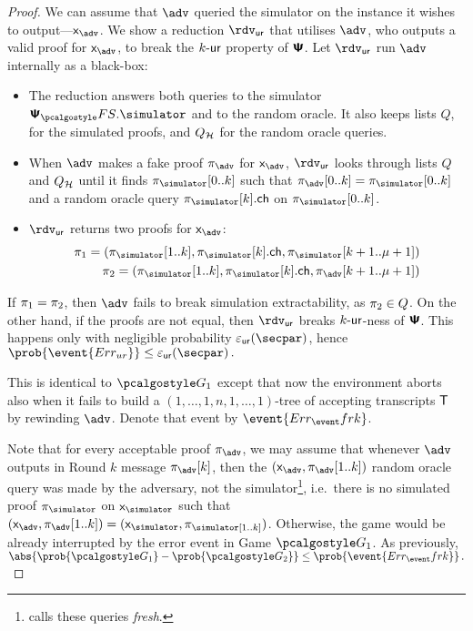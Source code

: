 \documentclass[runningheads,11pt]{llncs}
\begin{document}
\begin{proof}
{  We can assume that $\advse$ queried the simulator on the instance it wishes to
  output---$\inp_{\advse}$. We show a reduction $\rdvur$ that utilises $\advse$,
  who outputs a valid proof for $\inp_{\advse}$, to break the ${k\text{-}\mathsf{ur}}$ property of
  $\bm{\mathsf{\Psi}}$. Let $\rdvur$ run $\advse$ internally as a black-box:
\begin{itemize}
	\item The reduction answers both queries to the simulator $\psfs.\simulator$ and to the random oracle. 
	It also keeps lists $Q$, for the simulated proofs, and $Q_{\mathcal{H}}$ for the random oracle queries. 
\item When $\advse$ makes a fake proof $\zkproof_{\advse}$ for $\inp_{\advse}$,
  $\rdvur$ looks through lists $Q$ and $Q_{\mathcal{H}}$ until it finds
  $\zkproof_{\simulator}[0..k]$ such that
  $\zkproof_{\advse}[0..k] = \zkproof_{\simulator}[0..k]$
  and a random oracle query $\zkproof_{\simulator}[k].\ch$ on
  $\zkproof_{\simulator}[0..k]$.
	\item $\rdvur$ returns two proofs for $\inp_{\advse}$:
	\begin{align*}
		\zkproof_1 = (\zkproof_{\simulator}[1..k],
		\zkproof_{\simulator}[k].\ch, \zkproof_{\simulator}[k + 1..\mu + 1])\\
		\zkproof_2 = (\zkproof_{\simulator}[1..k],
		\zkproof_{\simulator}[k].\ch, \zkproof_{\advse}[k + 1..\mu + 1])
	\end{align*}
	\end{itemize}  
	If $\pi_1 = \pi_2$, then $\advse$ fails to break simulation
  extractability, as $\pi_2 \in Q$. On the other hand, if the proofs are
  not equal, then $\rdvur$ breaks ${k\text{-}\mathsf{ur}}$-ness of $\bm{\mathsf{\Psi}}$. This happens only with
  negligible probability $\epsur(\secpar)$, hence \( \prob{\event{\errur}} \leq
  \epsur(\secpar)\,. \)
}

   This is identical to $\game{1}$ except that now the environment
  aborts also when it fails to build a $(1, \ldots, 1, n, 1, \ldots, 1)$-tree
  of accepting transcripts $\mathsf{T}$ by rewinding $\advse$. Denote that event by
  $\event{\errfrk}$. 

   Note that for every acceptable proof
  $\zkproof_{\advse}$, we may assume that whenever $\advse$ outputs in Round $k$
  message $\zkproof_{\advse}[k]$, then the
  $(\inp_{\advse}, \zkproof_{\advse}[1..k])$ random oracle query was made
  by the adversary, not the simulator\footnote{\cite{INDOCRYPT:FKMV12} calls
    these queries \emph{fresh}.}, i.e.~there is no simulated proof
  $\zkproof_\simulator$ on $\inp_\simulator$ such that
  $(\inp_{\advse}, \zkproof_{\advse} [1..k]) = (\inp_\simulator,
  \zkproof_\simulator[1..k])$. Otherwise, the game would be already interrupted
  by the error event in Game $\game{1}$.  As previously,
\(
  \abs{\prob{\game{1}} - \prob{\game{2}}} \leq \prob{\event{\errfrk}}\,.
\)


\end{proof}
\end{document}
